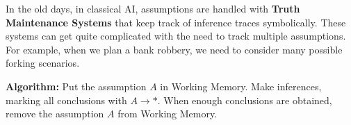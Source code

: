 \begin{tcolorbox}[breakable, parbox=false, fonttitle=\bfseries, title=Tic Tac Toe example]
In the old days, in classical AI, assumptions are handled with \textbf{Truth Maintenance Systems} that keep track of inference traces symbolically.  These systems can get quite complicated with the need to track multiple assumptions.  For example, when we plan a bank robbery, we need to consider many possible forking scenarios.  

\end{tcolorbox}

\textbf{Algorithm:}  Put the assumption $A$ in Working Memory.  Make inferences, marking all conclusions with $A \rightarrow *$.  When enough conclusions are obtained, remove the assumption $A$ from Working Memory.


